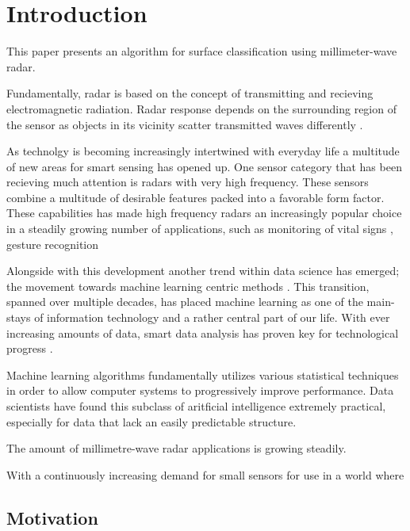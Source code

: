 \chapter{Introduction}

This paper presents an algorithm for surface classification using millimeter-wave radar. 

Fundamentally, radar is based on the concept of transmitting and recieving electromagnetic radiation. Radar response depends on the surrounding region of the sensor as objects in its vicinity scatter transmitted waves differently \citep{richards_2014}.  

 As technolgy is becoming increasingly intertwined with everyday life a multitude of new areas for smart sensing has opened up. One sensor category that has been recieving much attention is radars with very high frequency. These sensors combine a multitude of desirable features packed into a favorable form factor. These capabilities has made high frequency radars an increasingly popular choice in a steadily growing number of applications, such as monitoring of vital signs \citep{kuo_lin_yu_lo_lyu_chou_chuang_2016}, gesture recognition \citep{lien_gillian_karagozler_amihood_schwesig_olson_raja_poupyrev_2016}

Alongside with this development another trend within data science has emerged; the movement towards machine learning centric methods . This transition, spanned over multiple decades, has placed machine learning as one of the main-stays of information technology and a rather central part of our life. With ever increasing amounts of data, smart data analysis has proven key for technological progress \citep{a_smola_svn_vishwanathan_2010}.

Machine learning algorithms fundamentally utilizes various statistical techniques in order to allow computer systems to progressively improve performance. Data scientists have found this subclass of aritficial intelligence extremely practical, especially for data that lack an easily predictable structure. 

The amount of millimetre-wave radar applications is growing steadily.

With a continuously increasing demand for small sensors for use in a world where 

\section{Motivation}

